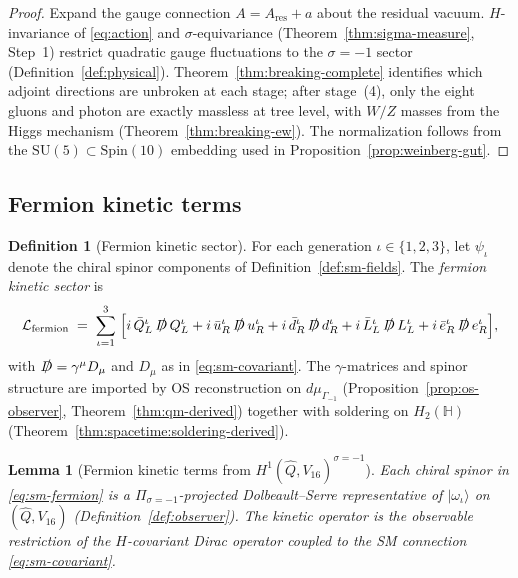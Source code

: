 \documentclass[11pt]{article}
\theoremstyle{plain}
\newtheorem{lemma}[theorem]{Lemma}
\theoremstyle{definition}
\newtheorem{definition}[theorem]{Definition}
\theoremstyle{remark}
\numberwithin{equation}{section}
\newcommand{\Quat}{\mathbb{H}}
\newcommand{\Spin}{\mathrm{Spin}}
\begin{document}
\begin{proof}
Expand the gauge connection $A=A_{\mathrm{res}}+a$ about the residual vacuum.
$H$-invariance of \eqref{eq:action} and $\sigma$-equivariance
(Theorem~\ref{thm:sigma-measure}, Step~1) restrict quadratic gauge
fluctuations to the $\sigma=-1$ sector (Definition~\ref{def:physical}).
Theorem~\ref{thm:breaking-complete} identifies which adjoint directions are
unbroken at each stage; after stage~(4), only the eight gluons and photon are
exactly massless at tree level, with $W/Z$ masses from the Higgs mechanism
(Theorem~\ref{thm:breaking-ew}). The normalization follows from the
$\mathrm{SU}(5)\subset\Spin(10)$ embedding used in
Proposition~\ref{prop:weinberg-gut}.
\end{proof}

\subsection{Fermion kinetic terms}
\label{sec:sm-lagrangian:fermion}

\begin{definition}[Fermion kinetic sector]\label{def:sm-fermion}
For each generation $\iota\in\{1,2,3\}$, let $\psi_{\iota}$ denote the chiral
spinor components of Definition~\ref{def:sm-fields}. The \emph{fermion kinetic
sector} is
\begin{equation}\label{eq:sm-fermion}
  \mathcal{L}_{\mathrm{fermion}}
  \;=\;
  \sum_{\iota=1}^{3}\;
  \Bigl[
    i\,\bar Q_L^\iota\,\slashed{D}\,Q_L^\iota
    + i\,\bar u_R^\iota\,\slashed{D}\,u_R^\iota
    + i\,\bar d_R^\iota\,\slashed{D}\,d_R^\iota
    + i\,\bar L_L^\iota\,\slashed{D}\,L_L^\iota
    + i\,\bar e_R^\iota\,\slashed{D}\,e_R^\iota
  \Bigr],
\end{equation}
with $\slashed{D}=\gamma^\mu D_\mu$ and $D_\mu$ as in \eqref{eq:sm-covariant}.
The $\gamma$-matrices and spinor structure are imported by OS reconstruction on
$d\mu_{\Gamma_{-1}}$ (Proposition~\ref{prop:os-observer}, Theorem~\ref{thm:qm-derived})
together with soldering on $H_2(\Quat)$
(Theorem~\ref{thm:spacetime:soldering-derived}).
\end{definition}

\begin{lemma}[Fermion kinetic terms from $H^1(\hat Q,V_{16})^{\sigma=-1}$]
\label{lem:sm-fermion-derived}
Each chiral spinor in \eqref{eq:sm-fermion} is a $\Pi_{\sigma=-1}$-projected
Dolbeault--Serre representative of $|\omega_\iota\rangle$ on
$(\hat Q,V_{16})$ (Definition~\ref{def:observer}). The kinetic operator is the
observable restriction of the $H$-covariant Dirac operator coupled to the SM
connection \eqref{eq:sm-covariant}.
\end{lemma}
\end{document}
